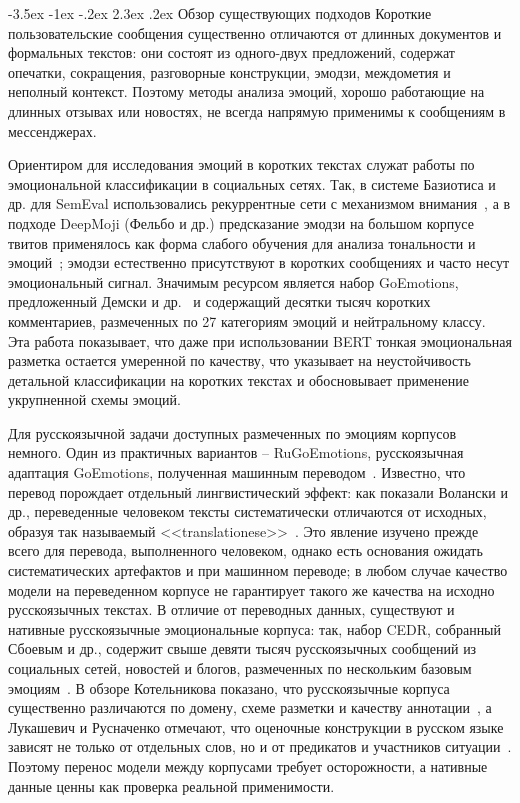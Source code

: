 \documentclass[12pt,a4paper]{report}
\makeatletter
\renewcommand{\section}{\@startsection{section}{1}{\z@}%
  {-3.5ex \@plus -1ex \@minus -.2ex}%
  {2.3ex \@plus .2ex}%
  {\normalfont\large\bfseries\centering}}
\makeatother
\begin{document}
\section{Обзор существующих подходов}
Короткие пользовательские сообщения существенно отличаются от длинных документов и формальных текстов: они состоят из одного-двух предложений, содержат опечатки, сокращения, разговорные конструкции, эмодзи, междометия и неполный контекст. Поэтому методы анализа эмоций, хорошо работающие на длинных отзывах или новостях, не всегда напрямую применимы к сообщениям в мессенджерах.

Ориентиром для исследования эмоций в коротких текстах служат работы по эмоциональной классификации в социальных сетях. Так, в системе Базиотиса и др. для SemEval использовались рекуррентные сети с механизмом внимания~\cite{baziotis2018semeval}, а в подходе DeepMoji (Фельбо и др.) предсказание эмодзи на большом корпусе твитов применялось как форма слабого обучения для анализа тональности и эмоций~\cite{felbo2017deepmoji}; эмодзи естественно присутствуют в коротких сообщениях и часто несут эмоциональный сигнал. Значимым ресурсом является набор GoEmotions, предложенный Демски и др.~\cite{demszky2020goemotions} и содержащий десятки тысяч коротких комментариев, размеченных по 27 категориям эмоций и нейтральному классу. Эта работа показывает, что даже при использовании BERT тонкая эмоциональная разметка остается умеренной по качеству, что указывает на неустойчивость детальной классификации на коротких текстах и обосновывает применение укрупненной схемы эмоций.

Для русскоязычной задачи доступных размеченных по эмоциям корпусов немного. Один из практичных вариантов -- RuGoEmotions, русскоязычная адаптация GoEmotions, полученная машинным переводом~\cite{searaRugoemotions}. Известно, что перевод порождает отдельный лингвистический эффект: как показали Волански и др., переведенные человеком тексты систематически отличаются от исходных, образуя так называемый <<translationese>>~\cite{volansky2015translationese}. Это явление изучено прежде всего для перевода, выполненного человеком, однако есть основания ожидать систематических артефактов и при машинном переводе; в любом случае качество модели на переведенном корпусе не гарантирует такого же качества на исходно русскоязычных текстах. В отличие от переводных данных, существуют и нативные русскоязычные эмоциональные корпуса: так, набор CEDR, собранный Сбоевым и др., содержит свыше девяти тысяч русскоязычных сообщений из социальных сетей, новостей и блогов, размеченных по нескольким базовым эмоциям~\cite{sboev2021cedr}. В обзоре Котельникова показано, что русскоязычные корпуса существенно различаются по домену, схеме разметки и качеству аннотации~\cite{kotelnikov2021russian}, а Лукашевич и Русначенко отмечают, что оценочные конструкции в русском языке зависят не только от отдельных слов, но и от предикатов и участников ситуации~\cite{loukachevitch2020frames}. Поэтому перенос модели между корпусами требует осторожности, а нативные данные ценны как проверка реальной применимости.
\end{document}
